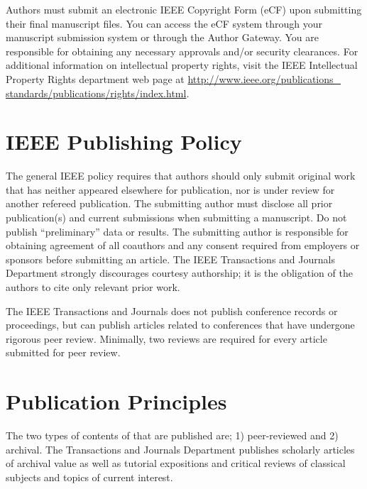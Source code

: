 \documentclass[journal]{IEEEtai}
\begin{document}
Authors must submit an electronic IEEE Copyright Form (eCF) upon submitting their final manuscript files. You can access the eCF system through your manuscript submission system or through the Author Gateway. You are responsible for obtaining any necessary approvals and/or security clearances. For additional information on intellectual property rights, visit the IEEE Intellectual Property Rights department web page at \underline{http://www.ieee.org/publications\_} \underline{standards/publications/rights/index.html}. 

\section{IEEE Publishing Policy}

The general IEEE policy requires that authors should only submit original work that has neither appeared elsewhere for publication, nor is under review for another refereed publication. The submitting author must disclose all prior publication(s) and current submissions when submitting a manuscript. Do not publish ``preliminary'' data or results. The submitting author is responsible for obtaining agreement of all coauthors and any consent required from employers or sponsors before submitting an article. The IEEE Transactions and Journals Department strongly discourages courtesy authorship; it is the obligation of the authors to cite only relevant prior work.

The IEEE Transactions and Journals does not publish conference records or proceedings, but can publish articles related to conferences that have undergone rigorous peer review. Minimally, two reviews are required for every article submitted for peer review.

\section{Publication Principles}

The two types of contents of that are published are; 1) peer-reviewed and 2) archival. The Transactions and Journals Department publishes scholarly articles of archival value as well as tutorial expositions and critical reviews of classical subjects and topics of current interest. 
\end{document}
